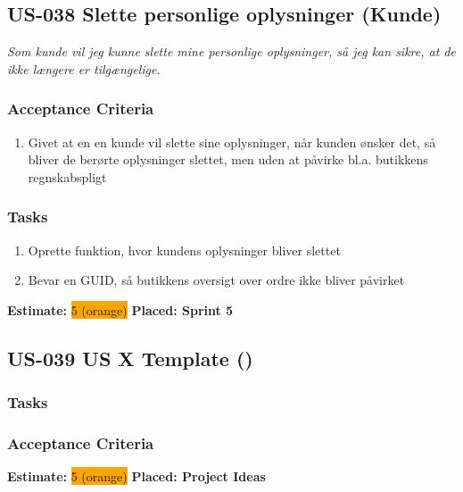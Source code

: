 \subsection{US-038 Slette personlige oplysninger (Kunde)}
\label{sec:US-038}
\textit{Som kunde vil jeg kunne slette mine personlige oplysninger, så jeg kan sikre, at de ikke længere er tilgængelige.}
\subsubsection*{\textbf{Acceptance Criteria}}
\begin{enumerate}
  \item Givet at en en kunde vil slette sine oplysninger, når kunden ønsker det, så bliver de berørte oplysninger slettet, men uden at påvirke bl.a. butikkens regnskabspligt
\end{enumerate}
\subsubsection*{\textbf{Tasks}}
\begin{enumerate}
  \item Oprette funktion, hvor kundens oplysninger bliver slettet
  \item Bevar en GUID, så butikkens oversigt over ordre ikke bliver påvirket
\end{enumerate}
\textbf{Estimate:} \colorbox{orange}{5 (orange)}
\textbf{Placed: Sprint 5}
\par\noindent\dotfill

\subsection{US-039 US X Template ()}
\label{sec:US-039}
\textit{}
\subsubsection*{\textbf{Tasks}}
\begin{enumerate}
\end{enumerate}
\subsubsection*{\textbf{Acceptance Criteria}}
\begin{enumerate}
\end{enumerate}
\textbf{Estimate:} \colorbox{orange}{5 (orange)}
\textbf{Placed: Project Ideas}
\par\noindent\dotfill

